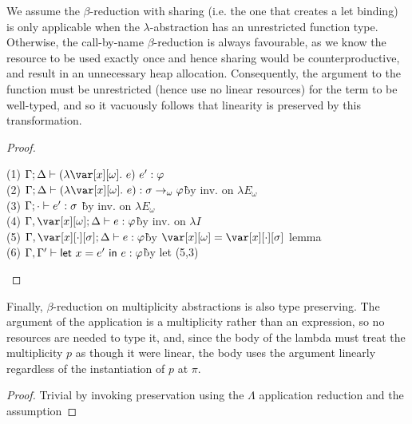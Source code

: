 \noindent We assume the $\beta$-reduction with sharing (i.e. the one that creates a let
binding) is only applicable when the $\lambda$-abstraction has an unrestricted
function type. Otherwise, the call-by-name $\beta$-reduction is always
favourable, as we know the resource to be used exactly once and hence sharing
would be counterproductive, and result in an unnecessary heap allocation.
%
Consequently, the argument to the function must be unrestricted (hence use no
linear resources) for the term to be well-typed, and so it vacuously follows
that linearity is preserved by this transformation.

\BetaReductionSharingTheorem

\begin{proof}~

\begin{tabbing}
    (1) $\G;\D \vdash (\lambda \xo.~e)~e' : \vp$\\
    (2) $\G; \D \vdash (\lambda \xo.~e) : \s \to_\omega \vp$\` by inv. on $\lambda E_\omega$\\
    (3) $\Gamma; \cdot \vdash e' : \sigma$ \` by inv. on $\lambda E_\omega$\\
    (4) $\G,\xo; \D \vdash e : \vp$\` by inv. on $\lambda I$\\
    (5) $\G, \x[\cdot][\s]; \D \vdash e : \vp$\` by $\xo = \x[\cdot][\s]$ lemma\\
    (6) $\Gamma,\Gamma' \vdash \mathsf{let}~x = e'~\mathsf{in}~e : \varphi$\` by let (5,3)\\
\end{tabbing}
\end{proof}

\noindent Finally, $\beta$-reduction on multiplicity abstractions is also type
preserving. The argument of the application is a multiplicity rather than an
expression, so no resources are needed to type it, and, since the body of the
lambda must treat the multiplicity $p$ as though it were linear, the body uses
the argument linearly regardless of the instantiation of $p$ at $\pi$.

\BetaReductionMultTheorem

\begin{proof}
    Trivial by invoking preservation using the $\Lambda$ application reduction and the assumption
\end{proof}


